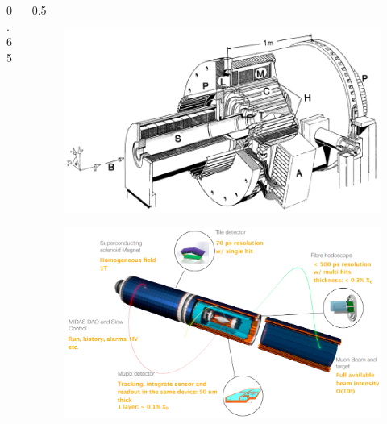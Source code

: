\documentclass{beamer}
\begin{document}
\begin{frame}
\begin{columns}
\begin{column}{0.65\framewidth}
\begin{itemize}
    \end{itemize}
    \end{column}
    \begin{column}{0.5\framewidth}
        \begin{figure}[!h]
            \centering
            \includegraphics[width =\columnwidth]{figures/png/The-SINDRUM-I-detector-in-the-horizontal-operating-orientation.png}
            \label{fig:sindrumi}
            \end{figure}
            \begin{figure}[!h]
                \centering
                \includegraphics[width =\columnwidth]{figures/png/Screenshot_20240321_143650}
                \label{fig:mu3e}
                \end{figure}
    \end{column}
\end{columns}
    \end{frame}
\end{document}
